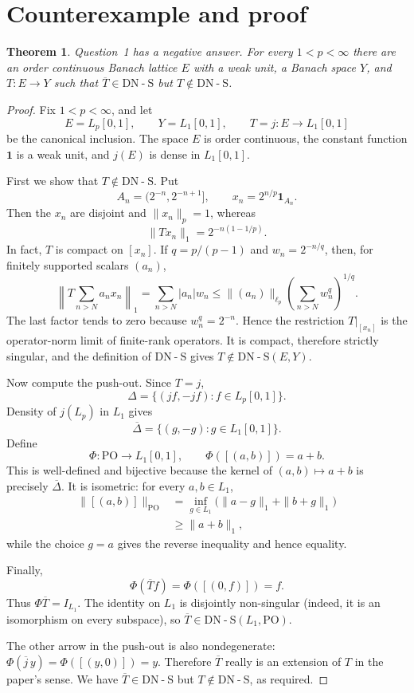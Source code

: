 \documentclass[11pt]{article}
\newtheorem{theorem}{Theorem}
\newcommand{\Lp}{L_p[0,1]}
\newcommand{\Lo}{L_1[0,1]}
\newcommand{\DNS}{\mathrm{DN\!\operatorname{-}S}}
\begin{document}
\section*{Counterexample and proof}

\begin{theorem}
Question~1 has a negative answer. For every $1<p<\infty$ there are an order
continuous Banach lattice $E$ with a weak unit, a Banach space $Y$, and
$T:E\to Y$ such that $\overline T\in\DNS$ but $T\notin\DNS$.
\end{theorem}

\begin{proof}
Fix $1<p<\infty$, and let
\[
 E=\Lp,
 \qquad Y=\Lo,
 \qquad T=j:E\longrightarrow\Lo
\]
be the canonical inclusion. The space $E$ is order continuous, the constant
function $\mathbf1$ is a weak unit, and $j(E)$ is dense in $L_1[0,1]$.

First we show that $T\notin\DNS$. Put
\[
 A_n=(2^{-n},2^{-n+1}],
 \qquad x_n=2^{n/p}\mathbf1_{A_n}.
\]
Then the $x_n$ are disjoint and $\|x_n\|_p=1$, whereas
\[
 \|Tx_n\|_1=2^{-n(1-1/p)}.
\]
In fact, $T$ is compact on $[x_n]$. If $q=p/(p-1)$ and
$w_n=2^{-n/q}$, then, for finitely supported scalars $(a_n)$,
\[
 \left\|T\sum_{n>N}a_nx_n\right\|_1
 =\sum_{n>N}|a_n|w_n
 \leq \|(a_n)\|_{\ell_p}
       \left(\sum_{n>N}w_n^q\right)^{1/q}.
\]
The last factor tends to zero because $w_n^q=2^{-n}$. Hence the restriction
$T|_{[x_n]}$ is the operator-norm limit of finite-rank operators. It is compact,
therefore strictly singular, and the definition of $\DNS$ gives
$T\notin\DNS(E,Y)$.

Now compute the push-out. Since $T=j$,
\[
 \Delta=\{(jf,-jf):f\in L_p[0,1]\}.
\]
Density of $j(L_p)$ in $L_1$ gives
\[
 \overline\Delta=\{(g,-g):g\in L_1[0,1]\}.
\]
Define
\[
 \Phi:\mathrm{PO}\longrightarrow L_1[0,1],
 \qquad \Phi([(a,b)])=a+b.
\]
This is well-defined and bijective because the kernel of
$(a,b)\mapsto a+b$ is precisely $\overline\Delta$. It is isometric: for every
$a,b\in L_1$,
\begin{align*}
 \|[(a,b)]\|_{\mathrm{PO}}
 &=\inf_{g\in L_1}\big(\|a-g\|_1+\|b+g\|_1\big)\\
 &\geq\|a+b\|_1,
\end{align*}
while the choice $g=a$ gives the reverse inequality and hence equality.

Finally,
\[
 \Phi(\overline T f)
 =\Phi([(0,f)])=f.
\]
Thus $\Phi\overline T=I_{L_1}$. The identity on $L_1$ is disjointly
non-singular (indeed, it is an isomorphism on every subspace), so
$\overline T\in\DNS(L_1,\mathrm{PO})$.

The other arrow in the push-out is also nondegenerate:
$\Phi(\overline j\,y)=\Phi([(y,0)])=y$. Therefore $\overline T$ really is an
extension of $T$ in the paper's sense. We have $\overline T\in\DNS$ but
$T\notin\DNS$, as required.
\end{proof}
\end{document}
